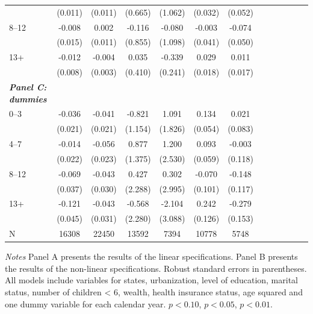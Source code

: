 \documentclass[12pt,english]{article}
\begin{document}
\begin{table}[!ht]
\begin{center}
\begin{adjustbox}{max width=\linewidth}
\begin{threeparttable}
{\begin{tabular}{l*{6}{S S}}
						&  (0.011)         &  (0.011)         &  (0.665)         &  (1.062)         &  (0.032)         &  (0.052)         \\
						8--12   &   -0.008         &    0.002         &   -0.116         &   -0.080         &   -0.003         &   -0.074         \\
						&  (0.015)         &  (0.011)         &  (0.855)         &  (1.098)         &  (0.041)         &  (0.050)         \\
						13+   &    -0.012         &   -0.004         &    0.035         &   -0.339         &    0.029         &    0.011         \\
						&  (0.008)         &  (0.003)         &  (0.410)         &  (0.241)         &  (0.018)         &  (0.017)         \\
						\textit{\textbf{Panel C: dummies}} &&&&&&\\
						0--3&   -0.036\sym{*}  &   -0.041\sym{**} &   -0.821         &    1.091         &    0.134\sym{**} &    0.021         \\
						&  (0.021)         &  (0.021)         &  (1.154)         &  (1.826)         &  (0.054)         &  (0.083)         \\
						4--7&   -0.014         &   -0.056\sym{**} &    0.877         &    1.200         &    0.093         &   -0.003         \\
						&  (0.022)         &  (0.023)         &  (1.375)         &  (2.530)         &  (0.059)         &  (0.118)         \\
						8--12 &  -0.069\sym{*}  &   -0.043         &    0.427         &    0.302         &   -0.070         &   -0.148         \\
						&  (0.037)         &  (0.030)         &  (2.288)         &  (2.995)         &  (0.101)         &  (0.117)         \\
						13+ &   -0.121\sym{***}&   -0.043         &   -0.568         &   -2.104         &    0.242\sym{*}  &   -0.279\sym{*}  \\
						&  (0.045)         &  (0.031)         &  (2.280)         &  (3.088)         &  (0.126)         &  (0.153)         \\
						\midrule
						N         &    16308         &    22450         &    13592         &     7394         &    10778         &     5748         \\
						\bottomrule
					\end{tabular}
					\begin{tablenotes}
						\item \footnotesize \textit{Notes} Panel A presents the results of the linear specifications. Panel B presents the results of the non-linear specifications. Robust standard errors in parentheses. All models include variables for  states, urbanization, level of education, marital status, number of children < 6, wealth, health insurance status, age squared and one dummy variable for each calendar year. \sym{*} \(p<0.10\), \sym{**} \(p<0.05\), \sym{***} \(p<0.01\).

\end{tablenotes}}
\end{threeparttable}
\end{adjustbox}
\end{center}
\end{table}
\end{document}
